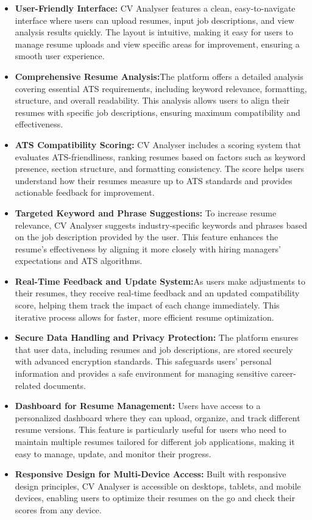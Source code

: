 \documentclass[12pt,a4paper]{report}
\begin{document}
\begin{itemize} \item \textbf{User-Friendly Interface:} CV Analyser features a clean, easy-to-navigate interface where users can upload resumes, input job descriptions, and view analysis results quickly. The layout is intuitive, making it easy for users to manage resume uploads and view specific areas for improvement, ensuring a smooth user experience.



\item \textbf{Comprehensive Resume Analysis:}The platform offers a detailed analysis covering essential ATS requirements, including keyword relevance, formatting, structure, and overall readability. This analysis allows users to align their resumes with specific job descriptions, ensuring maximum compatibility and effectiveness.
\item \textbf{ATS Compatibility Scoring:}  CV Analyser includes a scoring system that evaluates ATS-friendliness, ranking resumes based on factors such as keyword presence, section structure, and formatting consistency. The score helps users understand how their resumes measure up to ATS standards and provides actionable feedback for improvement.
\item \textbf{
Targeted Keyword and Phrase Suggestions:} To increase resume relevance, CV Analyser suggests industry-specific keywords and phrases based on the job description provided by the user. This feature enhances the resume’s effectiveness by aligning it more closely with hiring managers' expectations and ATS algorithms.

\item \textbf{Real-Time Feedback and Update System:}As users make adjustments to their resumes, they receive real-time feedback and an updated compatibility score, helping them track the impact of each change immediately. This iterative process allows for faster, more efficient resume optimization.
\item \textbf{Secure Data Handling and Privacy Protection:} The platform ensures that user data, including resumes and job descriptions, are stored securely with advanced encryption standards. This safeguards users' personal information and provides a safe environment for managing sensitive career-related documents.

\item \textbf{Dashboard for Resume Management:} Users have access to a personalized dashboard where they can upload, organize, and track different resume versions. This feature is particularly useful for users who need to maintain multiple resumes tailored for different job applications, making it easy to manage, update, and monitor their progress.

\item \textbf{Responsive Design for Multi-Device Access:}  Built with responsive design principles, CV Analyser is accessible on desktops, tablets, and mobile devices, enabling users to optimize their resumes on the go and check their scores from any device.
\end{itemize}
\end{document}
